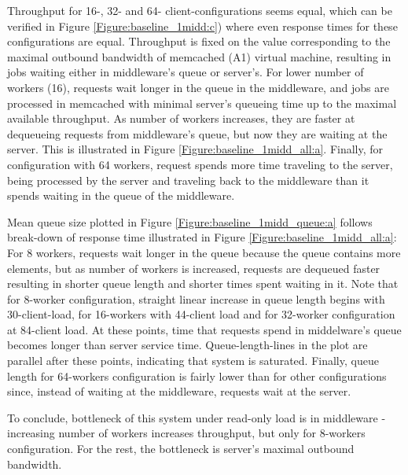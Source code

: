 \documentclass[11pt,a4paper]{article}
\begin{document}
Throughput for 16-, 32- and 64- client-configurations seems equal, which can be verified in Figure \ref{Figure:baseline_1midd:c}) where even response times for these configurations are equal. Throughput is fixed on the value corresponding to the maximal outbound bandwidth of memcached (A1) virtual machine, resulting in jobs waiting either in middleware's queue or server's. For lower number of workers (16), requests wait longer in the queue in the middleware, and jobs are processed in memcached with minimal server's queueing time up to the maximal available throughput. As number of workers increases, they are faster at dequeueing requests from middleware's queue, but now they are waiting at the server. This is illustrated in Figure \ref{Figure:baseline_1midd_all:a}. Finally, for configuration with 64 workers, request spends more time traveling to the server, being processed by the server and traveling back to the middleware than it spends waiting in the queue of the middleware.

Mean queue size plotted in Figure \ref{Figure:baseline_1midd_queue:a} follows break-down of response time illustrated in Figure \ref{Figure:baseline_1midd_all:a}: For 8 workers, requests wait longer in the queue because the queue contains more elements, but as number of workers is increased, requests are dequeued faster resulting in shorter queue length and shorter times spent waiting in it. Note that for 8-worker configuration, straight linear increase in queue length begins with 30-client-load, for 16-workers with 44-client load and for 32-worker configuration at 84-client load. At these points, time that requests spend in middelware's queue becomes longer than server service time. Queue-length-lines in the plot are parallel after these points, indicating that system is saturated. Finally, queue length for 64-workers configuration is fairly lower than for other configurations since, instead of waiting at the middleware, requests wait at the server.

To conclude, bottleneck of this system under read-only load is in middleware - increasing number of workers increases throughput, but only for 8-workers configuration. For the rest, the bottleneck is server's maximal outbound bandwidth. 
\end{document}
